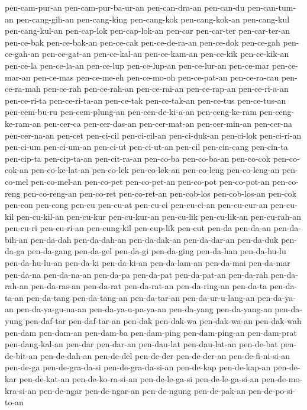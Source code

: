{pen-cam-pur-an pen-cam-pur-ba-ur-an pen-can-dra-an pen-can-du
pen-can-tum-an pen-cang-gih-an pen-cang-king pen-cang-kok pen-cang-kok-an
pen-cang-kul pen-cang-kul-an pen-cap-lok pen-cap-lok-an pen-car
pen-car-ter pen-car-ter-an pen-ce-bak pen-ce-bak-an pen-ce-cak
pen-ce-de-ra-an pen-ce-dok pen-ce-gah pen-ce-gah-an pen-ce-gat-an
pen-ce-kal-an pen-ce-kam-an pen-ce-kik pen-ce-kik-an pen-ce-la
pen-ce-la-an pen-ce-lup pen-ce-lup-an pen-ce-lur-an pen-ce-mar
pen-ce-mar-an pen-ce-mas pen-ce-me-eh pen-ce-mo-oh pen-ce-pat-an
pen-ce-ra-cau pen-ce-ra-mah pen-ce-rah pen-ce-rah-an pen-ce-rai-an
pen-ce-rap-an pen-ce-ri-a-an pen-ce-ri-ta pen-ce-ri-ta-an pen-ce-tak
pen-ce-tak-an pen-ce-tus pen-ce-tus-an pen-cem-bu-ru pen-cem-plung-an
pen-cen-de-ki-a-an pen-ceng-ke-ram pen-ceng-ke-ram-an pen-cer-ca
pen-cer-das-an pen-cer-mat-an pen-cer-min-an pen-cer-na pen-cer-na-an
pen-cet pen-ci-cil pen-ci-cil-an pen-ci-duk-an pen-ci-lok pen-ci-ri-an
pen-ci-um pen-ci-um-an pen-ci-ut pen-ci-ut-an pen-cil pen-cin-cang
pen-cin-ta pen-cip-ta pen-cip-ta-an pen-cit-ra-an pen-co-ba pen-co-ba-an
pen-co-cok pen-co-cok-an pen-co-ke-lat-an pen-co-lek pen-co-lek-an
pen-co-leng pen-co-leng-an pen-co-mel pen-co-mel-an pen-co-pet
pen-co-pet-an pen-co-pot pen-co-pot-an pen-co-reng pen-co-reng-an
pen-co-ret pen-co-ret-an pen-cob-los pen-cob-los-an pen-cok pen-con
pen-cong pen-cu pen-cu-at pen-cu-ci pen-cu-ci-an pen-cu-cur-an pen-cu-kil
pen-cu-kil-an pen-cu-kur pen-cu-kur-an pen-cu-lik pen-cu-lik-an
pen-cu-rah-an pen-cu-ri pen-cu-ri-an pen-cung-kil pen-cup-lik pen-cut
pen-da pen-da-an pen-da-bih-an pen-da-dah pen-da-dah-an pen-da-dak-an
pen-da-dar-an pen-da-duk pen-da-ga pen-da-gang pen-da-gel pen-da-gi
pen-da-ging pen-da-han pen-da-hu-lu pen-da-hu-lu-an pen-da-ki pen-da-ki-an
pen-da-lam-an pen-da-mai pen-da-mar pen-da-na pen-da-na-an pen-da-pa
pen-da-pat pen-da-pat-an pen-da-rah pen-da-rah-an pen-da-ras-an pen-da-rat
pen-da-rat-an pen-da-ring-an pen-da-ta pen-da-ta-an pen-da-tang
pen-da-tang-an pen-da-tar-an pen-da-ur-u-lang-an pen-da-ya-an
pen-da-ya-gu-na-an pen-da-ya-u-pa-ya-an pen-da-yang pen-da-yang-an
pen-da-yung pen-daf-tar pen-daf-tar-an pen-dak pen-dak-wa pen-dak-wa-an
pen-dak-wah pen-dam pen-dam-an pen-dam-ba pen-dam-ping pen-dam-ping-an
pen-dam-prat pen-dang-kal-an pen-dar pen-dar-an pen-dau-lat pen-dau-lat-an
pen-de-bat pen-de-bit-an pen-de-dah-an pen-de-del pen-de-der pen-de-der-an
pen-de-fi-ni-si-an pen-de-ga pen-de-gra-da-si pen-de-gra-da-si-an
pen-de-kap pen-de-kap-an pen-de-kar pen-de-kat-an pen-de-ko-ra-si-an
pen-de-le-ga-si pen-de-le-ga-si-an pen-de-mo-kra-si-an pen-de-ngar
pen-de-ngar-an pen-de-ngung pen-de-pak-an pen-de-po-si-to-an
}
